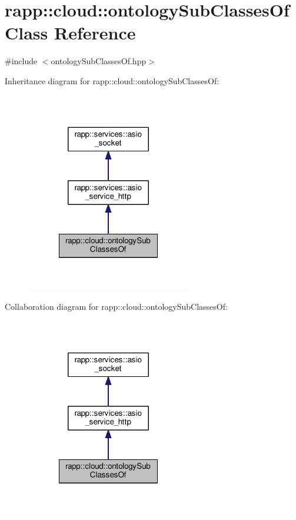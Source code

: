 \hypertarget{classrapp_1_1cloud_1_1ontologySubClassesOf}{\section{rapp\-:\-:cloud\-:\-:ontology\-Sub\-Classes\-Of Class Reference}
\label{classrapp_1_1cloud_1_1ontologySubClassesOf}
}


{\ttfamily \#include $<$ontology\-Sub\-Classes\-Of.\-hpp$>$}



Inheritance diagram for rapp\-:\-:cloud\-:\-:ontology\-Sub\-Classes\-Of\-:
\nopagebreak
\begin{figure}[H]
\begin{center}
\leavevmode
\includegraphics[width=204pt]{classrapp_1_1cloud_1_1ontologySubClassesOf__inherit__graph}
\end{center}
\end{figure}


Collaboration diagram for rapp\-:\-:cloud\-:\-:ontology\-Sub\-Classes\-Of\-:
\nopagebreak
\begin{figure}[H]
\begin{center}
\leavevmode
\includegraphics[width=204pt]{classrapp_1_1cloud_1_1ontologySubClassesOf__coll__graph}
\end{center}
\end{figure}
